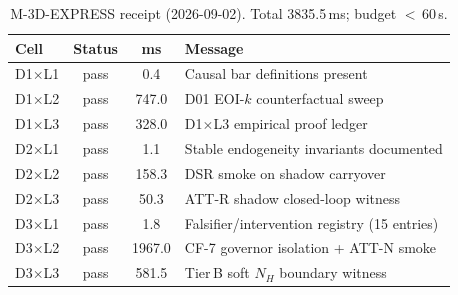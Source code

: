 \begin{table}[H]
\centering\small
\begin{tabular}{lccp{4.8cm}}
\toprule Cell & Status & ms & Message \\ \midrule
D1$\times$L1 & pass & 0.4 & Causal bar definitions present \\
D1$\times$L2 & pass & 747.0 & D01 EOI-$k$ counterfactual sweep \\
D1$\times$L3 & pass & 328.0 & D1$\times$L3 empirical proof ledger \\
D2$\times$L1 & pass & 1.1 & Stable endogeneity invariants documented \\
D2$\times$L2 & pass & 158.3 & DSR smoke on shadow carryover \\
D2$\times$L3 & pass & 50.3 & ATT-R shadow closed-loop witness \\
D3$\times$L1 & pass & 1.8 & Falsifier/intervention registry (15 entries) \\
D3$\times$L2 & pass & 1967.0 & CF-7 governor isolation + ATT-N smoke \\
D3$\times$L3 & pass & 581.5 & Tier\,B soft $N_H$ boundary witness \\ \bottomrule
\end{tabular}
\caption{M-3D-EXPRESS receipt (2026-09-02). Total 3835.5\,ms; budget $<$\,60\,s.}
\label{tab:express-receipt}
\end{table}
